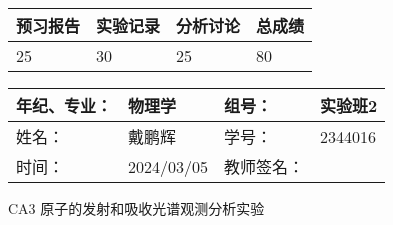\documentclass[dvipsnames, svgnames,a4paper,11pt]{article}
\begin{document}
\begin{table}
	\renewcommand\arraystretch{1.7}
	\begin{tabularx}{\textwidth}{
			|X|X|X|X
			|X|X|X|X|}
		\hline
		\multicolumn{2}{|c|}{预习报告}&\multicolumn{2}{|c|}{实验记录}&\multicolumn{2}{|c|}{分析讨论}&\multicolumn{2}{|c|}{总成绩}\\
		\hline
		\LARGE25 & & \LARGE30 & & \LARGE25 & & \LARGE80 & \\
		\hline
	\end{tabularx}
\end{table}


\begin{table}
	\renewcommand\arraystretch{1.7}
	\begin{tabularx}{\textwidth}{|X|X|X|X|}
	\hline
	年纪、专业：& 物理学 & 组号：& 实验班2\\
	\hline
	姓名：& 戴鹏辉  & 学号： & 2344016 \\
	\hline
	时间：& 2024/03/05 & 教师签名：& \\
	\hline
	\end{tabularx}
\end{table}

\begin{center}
	\LARGE CA3 \quad 原子的发射和吸收光谱观测分析实验
\end{center}
\end{document}
